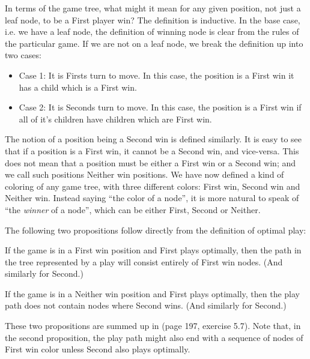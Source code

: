 In terms of the game tree, what might it mean for any given position, not just a leaf node, to be a First player win? The definition is inductive.
In the base case, i.e. we have a leaf node, the definition of winning node is clear from the rules of the particular game.
If we are not on a leaf node, we break the definition up into two cases:

\begin{definition}
\label{def:positionclasses}

\begin{itemize}
  \item Case 1: It is Firsts turn to move. In this case, the position is a First win it has a child which is a First win.

  \item Case 2: It is Seconds turn to move. In this case, the position is a First win if all of it's children have children which are First win.

\end{itemize}

\end{definition}
The notion of a position being a Second win is defined similarly.
It is easy to see that if a position is a First win, it cannot be a Second win, and vice-versa.
This does not mean that a position must be either a First win or a Second win; and we call such positions Neither win positions.
We have now defined a kind of coloring of any game tree, with three different colors: First win, Second win and Neither win.
Instead saying ``the color of a node'', it is more natural to speak of ``the \emph{winner} of a node'', which can be either First, Second or Neither.

The following two propositions follow directly from the definition of optimal play:

\begin{proposition}
If the game is in a First win position and First plays optimally, then the path in the tree represented by a play will consist entirely of First win nodes.
(And similarly for Second.)
\end{proposition}

\begin{proposition}
If the game is in a Neither win position and First plays optimally, then the play path does not contain nodes where Second wins.
(And similarly for Second.)
\end{proposition}
These two propositions are summed up in \citep{aimodernapproach} (page 197, exercise 5.7).
Note that, in the second proposition, the play path might also end with a sequence of nodes of First win color unless Second also plays optimally.

